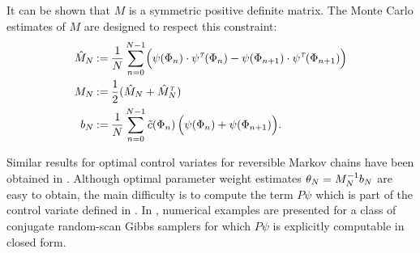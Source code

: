 It can be shown that $M$ is a symmetric positive definite matrix. The Monte Carlo estimates of $M$ are designed to respect this constraint:
\[
\begin{aligned}
\hat{M}_N & \mathbin{:=} \frac{1}{N} \sum_{n=0}^{N-1} \Bigl(\psi(\Phi_n) \cdot\psi^{\hbox{\tiny\it T}}(\Phi_n) - \psi(\Phi_{n+1})\cdot \psi^{\hbox{\tiny\it T}}(\Phi_{n+1}) \Bigr) \\
M_N  & \mathbin{:=} \frac{1}{2} (\hat{M}_N + \hat{M}_N^{\hbox{\tiny\it T}} )\\
b_N & \mathbin{:=}  \frac{1}{N} \sum_{n=0}^{N-1} \tilde c(\Phi_n)\, \Bigl( \psi(\Phi_n) + \psi(\Phi_{n+1}) \Bigr).
\end{aligned}
\]

Similar results for optimal control variates for reversible Markov chains have been obtained in \cite{delkon12}. Although optimal parameter weight estimates $\theta_N = M_N^{-1} b_N$ are easy to obtain, the main difficulty is to compute the term $P\psi$ which is part of the control variate defined in . In \cite{delkon12}, numerical examples are presented for a class of conjugate random-scan Gibbs samplers for which $P\psi$ is explicitly computable in closed form.  %
